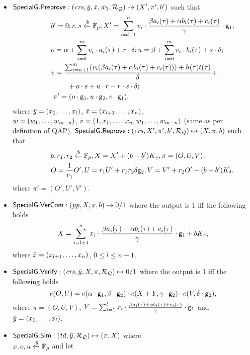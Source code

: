 {\begin{definition}
\begin{itemize}
\item ${\mathsf{SpecialG}}.{\mathsf{Preprove}}: (\mathit{crs}, \bar{y}, \bar{x}, \bar{w}_1, \mathcal{R}_{\mathcal{Q}}) \mapsto (X', \pi', b')$ such that \\
\begin{align*}
&\ \ \ \ \ \ \ \   b' = 0; r, s\xleftarrow{\$} \mathbb{F}_p; X' = \sum_{i=l+1}^{n} v_i \cdot  \frac{\beta a_i(\tau)+ \alpha b_i(\tau)+ c_i(\tau)}{\gamma} \cdot \mathsf{g}_1;  \\
&\ \ \ \ \ \ \ \  o = \alpha + \sum_{i=0}^{m} v_i \cdot a_i(\tau) + r \cdot \delta; u = \beta + \sum_{i=0}^{m} v_i \cdot b_i(\tau) + s \cdot \delta; \\ 
&\ \ \ \ \ \ \ \   v = \frac{\sum_{i=n+1}^{m} (v_i (\beta a_i(\tau)+ \alpha b_i(\tau)+ c_i(\tau))) + h(\tau)t(\tau)}{\delta}   + \\ 
& \ \ \ \ \ \ \ \ \ \ \ \ \  \ \   + o\cdot s + u \cdot r - r \cdot s \cdot \delta; \\
&\ \ \ \ \ \ \ \ \ \pi' = (o \cdot \mathsf{g}_1, u \cdot \mathsf{g}_2, v \cdot \mathsf{g}_1), 
\end{align*}
where $\bar{y} = (x_1, \ldots, x_l)$, $\bar{x} = (x_{l+1}, \ldots, x_n)$, \\
$\bar{w} = (w_1, \ldots, w_{m-n})$, $\bar{v} = (1, x_1, \ldots, x_n, w_1, \ldots, w_{m-n})$ (same as per definition of QAP).
${\mathsf{SpecialG}}.{\mathsf{Reprove}}: (\mathit{crs}, X', \pi', b', \mathcal{R}_{\mathcal{Q}}) \mapsto (X, \pi, b)$  such that
\begin{align*}
&\ \ \ \ \ \ \ \  b , r_1, r_2  \xleftarrow{\$} \mathbb{F}_p, X = X' + (b- b') K_{\gamma}, \pi = (O, U, V), \\
&\ \ \ \ \ \ \ \ O = \frac{1}{r_1} O', U = r_1 U' + r_1r_2 \delta \mathsf{g}_2, V = V' + r_2O'  - (b - b') K_{\delta} .
\end{align*}
\noindent where $\pi' = (O', U', V')$.
\item ${\mathsf{SpecialG}}.{\mathsf{VerCom}}: (\mathit{pp}, X, \bar{x}, b) \mapsto 0/1$ where the output is 1 iff the following holds
$$X = \sum_{i=l+1}^{n} x_i \cdot  \frac{\beta a_i(\tau)+ \alpha b_i(\tau)+ c_i(\tau)}{\gamma} \cdot \mathsf{g}_1  + b K_{\gamma},$$
where $\bar{x} = (x_{l+1}, \ldots, x_n)$, $ 0 \leq l \leq n-1$. 
\item ${\mathsf{SpecialG}}.{\mathsf{Verify}}: (\mathit{crs}, \bar{y}, X, \pi, \mathcal{R}_{\mathcal{Q}}) \mapsto 0/1$ where the output is 1 iff the following holds 
$$e(O,U) = e(\alpha \cdot \mathsf{g}_1, \beta \cdot \mathsf{g}_2) \cdot e(X + Y, \gamma \cdot \mathsf{g}_2) \cdot e(V, \delta \cdot \mathsf{g}_2),$$
where $\pi = (O, U, V)$, $Y = \sum_{i=1}^{l} x_i \cdot \frac{\beta a_i(\tau)+ \alpha b_i(\tau)+ c_i(\tau)}{\gamma}  \cdot \mathsf{g}_1$ 
and $\bar{y} = (x_1, \ldots, x_l)$.
\item ${\mathsf{SpecialG}}.{\mathsf{Sim}}: (\mathit{td}, \bar{y}, \mathcal{R}_{\mathcal{Q}}) \mapsto (\pi, X)$ where \\ $x, o, u \xleftarrow {\$} \mathbb{F}_p$ and let 

\end{itemize}
\end{definition}}
